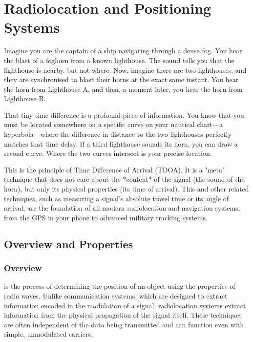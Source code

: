 
\chapter{Radiolocation and Positioning Systems}
\label{ch:radiolocation}

\begin{nontechnical}
    Imagine you are the captain of a ship navigating through a dense fog. You hear the blast of a foghorn from a known lighthouse. The sound tells you that the lighthouse is nearby, but not where. Now, imagine there are two lighthouses, and they are synchronised to blast their horns at the exact same instant. You hear the horn from Lighthouse A, and then, a moment later, you hear the horn from Lighthouse B.

    That tiny time difference is a profound piece of information. You know that you must be located somewhere on a specific curve on your nautical chart—a hyperbola—where the difference in distance to the two lighthouses perfectly matches that time delay. If a third lighthouse sounds its horn, you can draw a second curve. Where the two curves intersect is your precise location.

    This is the principle of Time Difference of Arrival (TDOA). It is a "meta" technique that does not care about the *content* of the signal (the sound of the horn), but only its physical properties (its time of arrival). This and other related techniques, such as measuring a signal's absolute travel time or its angle of arrival, are the foundation of all modern radiolocation and navigation systems, from the GPS in your phone to advanced military tracking systems.
\end{nontechnical}

\section{Overview and Properties}

\subsection{Overview}

 is the process of determining the position of an object using the properties of radio waves. Unlike communication systems, which are designed to extract information encoded in the modulation of a signal, radiolocation systems extract information from the physical propagation of the signal itself. These techniques are often independent of the data being transmitted and can function even with simple, unmodulated carriers.

